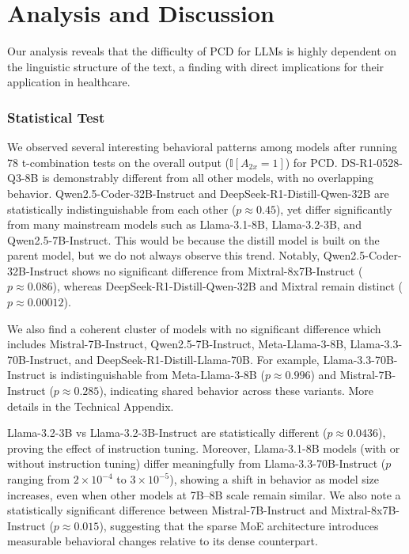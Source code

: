 \documentclass[conference]{IEEEtran}
\begin{document}
\section{Analysis and Discussion}
Our analysis reveals that the difficulty of PCD for LLMs is highly dependent on the linguistic structure of the text, a finding with direct implications for their application in healthcare.
\subsubsection{Statistical Test}
We observed several interesting behavioral patterns among models after running 78 t-combination tests on the overall output ($\mathbb{I}[A_{2x}=1]$) for PCD. DS-R1-0528-Q3-8B is demonstrably different from all other models, with no overlapping behavior. Qwen2.5-Coder-32B-Instruct and DeepSeek-R1-Distill-Qwen-32B are statistically indistinguishable from each other ($p \approx 0.45$), yet differ significantly from many mainstream models such as Llama-3.1-8B, Llama-3.2-3B, and Qwen2.5-7B-Instruct. This would be because the distill model is built on the parent model, but we do not always observe this trend. Notably, Qwen2.5-Coder-32B-Instruct shows no significant difference from Mixtral-8x7B-Instruct ($p \approx 0.086$), whereas DeepSeek-R1-Distill-Qwen-32B and Mixtral remain distinct ($p \approx 0.00012$).

We also find a coherent cluster of models with no significant difference which includes Mistral-7B-Instruct, Qwen2.5-7B-Instruct, Meta-Llama-3-8B, Llama-3.3-70B-Instruct, and DeepSeek-R1-Distill-Llama-70B. For example, Llama-3.3-70B-Instruct is indistinguishable from Meta-Llama-3-8B ($p \approx 0.996$) and Mistral-7B-Instruct ($p \approx 0.285$), indicating shared behavior across these variants. More details in the Technical Appendix.

Llama-3.2-3B vs Llama-3.2-3B-Instruct are statistically different ($p \approx 0.0436$), proving the effect of instruction tuning. Moreover, Llama-3.1-8B models (with or without instruction tuning) differ meaningfully from Llama-3.3-70B-Instruct ($p$ ranging from $2 \times 10^{-4}$ to $3 \times 10^{-5}$), showing a shift in behavior as model size increases, even when other models at 7B–8B scale remain similar. We also note a statistically significant difference between Mistral-7B-Instruct and Mixtral-8x7B-Instruct ($p \approx 0.015$), suggesting that the sparse MoE architecture introduces measurable behavioral changes relative to its dense counterpart.
\end{document}
